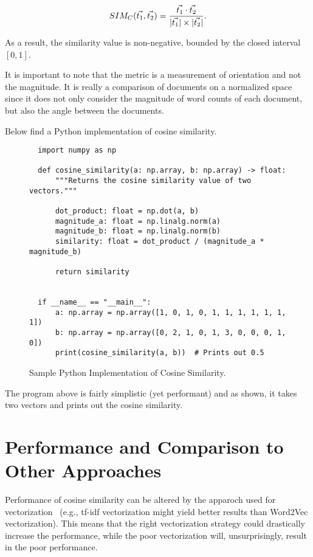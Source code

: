 \documentclass[11pt]{article}
\DeclarePairedDelimiter\abs{\lvert}{\rvert}               %
\begin{document}
\[SIM_C(\vec{t_1}, \vec{t_2}) = \dfrac{\vec{t_1} \cdot
  \vec{t_2}}{\abs{\vec{t_1}} \times \abs{\vec{t_2}}}.\]

As a result, the similarity value is non-negative, bounded by the closed
interval \([0,1]\).

\bigskip

It is important to note that the metric is a measurement of orientation and not
the magnitude. It is really a comparison of documents on a normalized space
since it does not only consider the magnitude of word counts of each document,
but also the angle between the documents.

\bigskip

Below find a Python implementation of cosine similarity.

\begin{figure}[H]
  \begin{verbatim}
  import numpy as np

  def cosine_similarity(a: np.array, b: np.array) -> float:
      """Returns the cosine similarity value of two vectors."""

      dot_product: float = np.dot(a, b)
      magnitude_a: float = np.linalg.norm(a)
      magnitude_b: float = np.linalg.norm(b)
      similarity: float = dot_product / (magnitude_a * magnitude_b)

      return similarity


  if __name__ == "__main__":
      a: np.array = np.array([1, 0, 1, 0, 1, 1, 1, 1, 1, 1, 1])
      b: np.array = np.array([0, 2, 1, 0, 1, 3, 0, 0, 0, 1, 0])
      print(cosine_similarity(a, b))  # Prints out 0.5
  \end{verbatim}
  \caption{Sample Python Implementation of Cosine Similarity.}
\end{figure}

The program above is fairly simplistic (yet performant) and as shown, it takes
two vectors and prints out the cosine similarity.


\section{Performance and Comparison to Other Approaches}

Performance of cosine similarity can be altered by the apparoch used for
vectorization~\cite{sitikhu2019} (e.g., tf-idf vectorization might yield better
results than Word2Vec vectorization). This means that the right vectorization
strategy could drastically increase the performance, while the poor
vectorization will, unsurprisingly, result in the poor performance.
\end{document}
